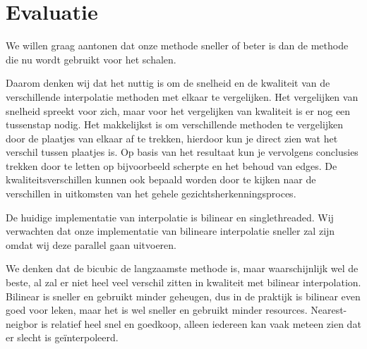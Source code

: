 \documentclass[a4paper]{article}
\begin{document}
\section{Evaluatie}
\label{sec:org0ec2fbd}
We willen graag aantonen dat onze methode sneller of beter
is dan de methode die nu wordt gebruikt voor het schalen.

Daarom denken wij dat het nuttig is om de snelheid en de kwaliteit van
de verschillende interpolatie methoden met elkaar te vergelijken. Het
vergelijken van snelheid spreekt voor zich, maar voor het vergelijken
van kwaliteit is er nog een tussenstap nodig. Het makkelijkst is om
verschillende methoden te vergelijken door de plaatjes van elkaar af
te trekken, hierdoor kun je direct zien wat het verschil tussen
plaatjes is. Op basis van het resultaat kun je vervolgens conclusies
trekken door te letten op bijvoorbeeld scherpte en het behoud van
edges. De kwaliteitsverschillen kunnen ook bepaald worden door te
kijken naar de verschillen in uitkomsten van het gehele
gezichtsherkenningsproces.

De huidige implementatie van interpolatie is bilinear en
singlethreaded. Wij verwachten dat onze implementatie van bilineare
interpolatie sneller zal zijn omdat wij deze parallel gaan uitvoeren.

We denken dat de bicubic de langzaamste methode is, maar
waarschijnlijk wel de beste, al zal er niet heel veel verschil zitten
in kwaliteit met bilinear interpolation. Bilinear is sneller en gebruikt minder geheugen, dus in de praktijk is bilinear even goed voor leken, maar het is wel sneller en gebruikt minder resources. Nearest-neigbor is relatief heel snel en goedkoop, alleen iedereen kan vaak meteen zien dat er slecht is geïnterpoleerd.
\end{document}
